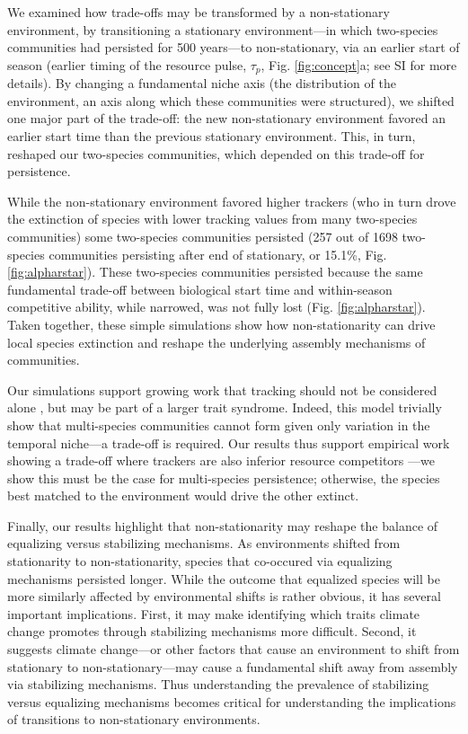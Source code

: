 \documentclass[11pt,letterpaper]{article}
\begin{document}
We examined how trade-offs may be transformed by a non-stationary environment, by transitioning a stationary environment---in which two-species communities had persisted for 500 years---to non-stationary, via an earlier start of season (earlier timing of the resource pulse, $\tau_p$, Fig. \ref {fig:concept}a; see SI for more details). By changing a fundamental niche axis (the distribution of the environment, an axis along which these communities were structured), we shifted one major part of the trade-off: the new non-stationary environment favored an earlier start time than the previous stationary environment. This, in turn, reshaped our two-species communities, which depended on this trade-off for persistence. 

While the non-stationary environment favored higher trackers (who in turn drove the extinction of species with lower tracking values from many two-species communities) some two-species communities persisted (257 out of 1698 two-species communities persisting after end of stationary, or 15.1\%, Fig. \ref{fig:alpharstar}). These two-species communities persisted because the same fundamental trade-off between biological start time and within-season competitive ability, while narrowed, was not fully lost (Fig. \ref{fig:alpharstar}). Taken together, these simple simulations show how non-stationarity can drive local species extinction and reshape the underlying assembly mechanisms of communities.

Our simulations support growing work that tracking should not be considered alone \citep{Diamond:2011nx,Dorji2013,Ishioka2013,kharouba2014,du2017}, but may be part of a larger trait syndrome. Indeed, this model trivially show that multi-species communities cannot form given only variation in the temporal niche---a trade-off is required. Our results thus support empirical work showing a trade-off where trackers are also inferior resource competitors \citep{lasky2016,Zhu2016BioLetters}---we show this must be the case for multi-species persistence; otherwise, the species best matched to the environment would drive the other extinct.

Finally, our results highlight that non-stationarity may reshape the balance of equalizing versus stabilizing mechanisms. As environments shifted from stationarity to non-stationarity, species that co-occured via equalizing mechanisms persisted longer. While the outcome that equalized species will be more similarly affected by environmental shifts is rather obvious, it has several important implications. First, it may make identifying which traits climate change promotes through stabilizing mechanisms more difficult. Second, it suggests climate change---or other factors that cause an environment to shift from stationary to non-stationary---may cause a fundamental shift away from assembly via stabilizing mechanisms. Thus understanding the prevalence of stabilizing versus equalizing mechanisms \citep[which ecology has worked on for many decades,][]{Caswell:1976np,Chesson:2000vd} becomes critical for understanding the implications of transitions to non-stationary environments. 
\end{document}
